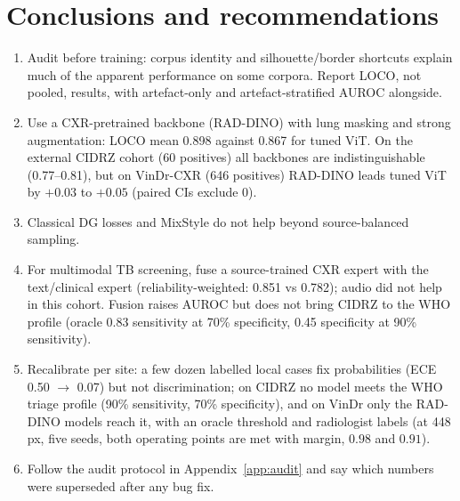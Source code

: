 \documentclass[10pt,a4paper]{article}
\begin{document}
\section{Conclusions and recommendations}
\begin{enumerate}
\item Audit before training: corpus identity and silhouette/border shortcuts explain much of the apparent performance on some corpora. Report LOCO, not pooled, results, with artefact-only and artefact-stratified AUROC alongside.
\item Use a CXR-pretrained backbone (RAD-DINO) with lung masking and strong augmentation: LOCO mean 0.898 against 0.867 for tuned ViT. On the external CIDRZ cohort (60 positives) all backbones are indistinguishable (0.77--0.81), but on VinDr-CXR (646 positives) RAD-DINO leads tuned ViT by $+0.03$ to $+0.05$ (paired CIs exclude 0).
\item Classical DG losses and MixStyle do not help beyond source-balanced sampling.
\item For multimodal TB screening, fuse a source-trained CXR expert with the text/clinical expert (reliability-weighted: 0.851 vs 0.782); audio did not help in this cohort. Fusion raises AUROC but does not bring CIDRZ to the WHO profile (oracle 0.83 sensitivity at 70\% specificity, 0.45 specificity at 90\% sensitivity).
\item Recalibrate per site: a few dozen labelled local cases fix probabilities (ECE 0.50 $\rightarrow$ 0.07) but not discrimination; on CIDRZ no model meets the WHO triage profile (90\% sensitivity, 70\% specificity), and on VinDr only the RAD-DINO models reach it, with an oracle threshold and radiologist labels (at 448\,px, five seeds, both operating points are met with margin, $0.98$ and $0.91$).
\item Follow the audit protocol in Appendix~\ref{app:audit} and say which numbers were superseded after any bug fix.
\end{enumerate}

\appendix
\end{document}
